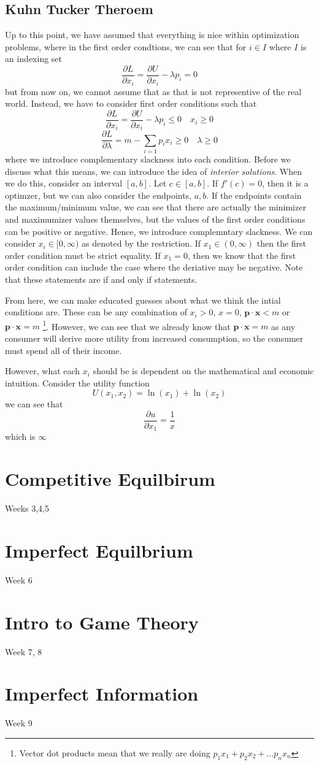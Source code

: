 \documentclass[12pt]{article}
\begin{document}
\subsection{Kuhn Tucker Theroem}
Up to this point, we have assumed that everything is nice within optimization problems, where in the first order condtions, we can see that for $i \in I$ where $I$ is an indexing set
\[
\frac{\partial L}{\partial x_i} = \frac{\partial U}{\partial x_i} - \lambda p_i = 0
\]
but from now on, we cannot assume that as that is not representive of the real world. Instead, we have to consider first order conditions such that
\[
\frac{\partial L}{\partial x_i} =  \frac{\partial U}{\partial x_i} - \lambda p_i \leq 0 \quad x_i \geq 0
\] 
\[
\frac{\partial L}{\partial \lambda} = m - \sum_{i=1} p_i x_i \geq 0 \quad \lambda \geq 0 
\]
where we introduce complementary slackness into each condition. Before we discuss what this means, we can introduce the idea of \emph{interior solutions}. When we do this, consider an interval $[a,b]$. Let $c \in [a,b]$. If $f'(c) = 0$, then it is a optimzer, but we can also consider the endpoints, $a,b$. If the endpoints contain the maximum/minimum value, we can see that there are actually the minimizer and maximumizer values themselves, but the values of the first order conditions can be positive or negative. Hence, we introduce complemntary slackness. We can consider $x_i \in [0, \infty)$ as denoted by the restriction. If $x_1 \in (0,\infty)$ then the first order condition must be strict equality. If $x_1 = 0$, then we know that the first order condition can include the case where the deriative may be negative. Note that these statements are if and only if statements. 


From here, we can make educated guesses about what we think the intial conditions are. These can be any combination of $x_i > 0$, $x = 0$, $\mathbf{p} \cdot \mathbf{x} < m$ or $\mathbf{p} \cdot \mathbf{x} = m$ \footnote{Vector dot products mean that we really are doing $p_1 x_1 + p_2 x_2 + \dots p_n x_n$}. However, we can see that we already know that $\mathbf{p} \cdot \mathbf{x} = m$ as any consumer will derive more utility from increased consumption, so the consumer must spend all of their income. 


However, what each $x_i$ should be is dependent on the mathematical and economic intuition. Consider the utility function
\[
U(x_1, x_2) = \ln(x_1) + \ln(x_2)
\]
we can see that 
\[
\frac{\partial u}{\partial x_1} = \frac{1}{x} 
\]
which is $\infty$ 
\section{Competitive Equilbirum}
Weeks 3,4,5
\section{Imperfect Equilbrium}
Week 6
\section{Intro to Game Theory}
Week 7, 8
\section{Imperfect Information}
Week 9
\end{document}
